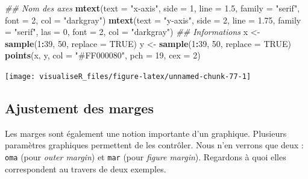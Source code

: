 \documentclass[]{article}
\newenvironment{Shaded}{\begin{snugshade}}{\end{snugshade}}
\newcommand{\CommentTok}[1]{\textcolor[rgb]{0.56,0.35,0.01}{\textit{#1}}}
\newcommand{\DataTypeTok}[1]{\textcolor[rgb]{0.13,0.29,0.53}{#1}}
\newcommand{\DecValTok}[1]{\textcolor[rgb]{0.00,0.00,0.81}{#1}}
\newcommand{\FloatTok}[1]{\textcolor[rgb]{0.00,0.00,0.81}{#1}}
\newcommand{\KeywordTok}[1]{\textcolor[rgb]{0.13,0.29,0.53}{\textbf{#1}}}
\newcommand{\NormalTok}[1]{#1}
\newcommand{\OperatorTok}[1]{\textcolor[rgb]{0.81,0.36,0.00}{\textbf{#1}}}
\newcommand{\OtherTok}[1]{\textcolor[rgb]{0.56,0.35,0.01}{#1}}
\newcommand{\StringTok}[1]{\textcolor[rgb]{0.31,0.60,0.02}{#1}}
\begin{document}
\begin{Shaded}
\begin{Highlighting}[]
\CommentTok{## Nom des axes}
\KeywordTok{mtext}\NormalTok{(}\DataTypeTok{text =} \StringTok{"x-axis"}\NormalTok{, }\DataTypeTok{side =} \DecValTok{1}\NormalTok{, }\DataTypeTok{line =} \FloatTok{1.5}\NormalTok{, }\DataTypeTok{family =} \StringTok{"serif"}\NormalTok{, }\DataTypeTok{font =} \DecValTok{2}\NormalTok{, }\DataTypeTok{col =} \StringTok{"darkgray"}\NormalTok{)}
\KeywordTok{mtext}\NormalTok{(}\DataTypeTok{text =} \StringTok{"y-axis"}\NormalTok{, }\DataTypeTok{side =} \DecValTok{2}\NormalTok{, }\DataTypeTok{line =} \FloatTok{1.75}\NormalTok{, }\DataTypeTok{family =} \StringTok{"serif"}\NormalTok{, }\DataTypeTok{las =} \DecValTok{0}\NormalTok{, }\DataTypeTok{font =} \DecValTok{2}\NormalTok{, }\DataTypeTok{col =} \StringTok{"darkgray"}\NormalTok{)}
\CommentTok{## Informations}
\NormalTok{x <-}\StringTok{ }\KeywordTok{sample}\NormalTok{(}\DecValTok{1}\OperatorTok{:}\DecValTok{39}\NormalTok{, }\DecValTok{50}\NormalTok{, }\DataTypeTok{replace =} \OtherTok{TRUE}\NormalTok{)}
\NormalTok{y <-}\StringTok{ }\KeywordTok{sample}\NormalTok{(}\DecValTok{1}\OperatorTok{:}\DecValTok{39}\NormalTok{, }\DecValTok{50}\NormalTok{, }\DataTypeTok{replace =} \OtherTok{TRUE}\NormalTok{)}
\KeywordTok{points}\NormalTok{(x, y, }\DataTypeTok{col =} \StringTok{"#FF000080"}\NormalTok{, }\DataTypeTok{pch =} \DecValTok{19}\NormalTok{, }\DataTypeTok{cex =} \DecValTok{2}\NormalTok{)}
\end{Highlighting}
\end{Shaded}

\begin{center}\texttt{[image: visualiseR\_files/figure-latex/unnamed-chunk-77-1]} \end{center}

\hypertarget{ajustement-des-marges}{%
\subsection{Ajustement des marges}\label{ajustement-des-marges}}

Les marges sont également une notion importante d'un graphique. Plusieurs paramètres graphiques permettent de les contrôler. Nous n'en verrons que deux : \texttt{oma} (pour \emph{outer margin}) et \texttt{mar} (pour \emph{figure margin}). Regardons à quoi elles correspondent au travers de deux exemples.
\end{document}

